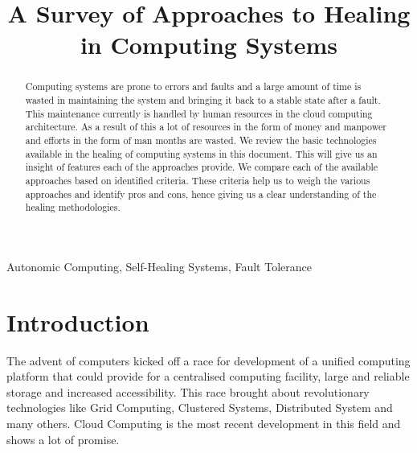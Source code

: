 \documentclass[conference]{IEEEtran}
\begin{document}
\title{A Survey of Approaches to Healing in Computing Systems}
\author
{
}
\maketitle

\begin{abstract}
Computing systems are prone to errors and faults and a large amount of time is wasted in maintaining the system and bringing it back to a stable state after a fault. This maintenance currently is handled by human resources in the cloud computing architecture. As a result of this a lot of resources in the form of money and manpower and efforts in the form of man months are wasted. We review the basic technologies available in the healing of computing systems in this document. This will give us an insight of features each of the approaches provide. We compare each of the available approaches based on identified criteria. These criteria help us to weigh the various approaches and identify pros and cons, hence giving us a clear understanding of the healing methodologies.
\end{abstract}
\begin{IEEEkeywords}
Autonomic Computing, Self-Healing Systems, Fault Tolerance
\end{IEEEkeywords}

\section{Introduction}
The advent of computers kicked off a race for development of a unified computing platform that could provide for a centralised computing facility, large and reliable storage and increased accessibility.\cite{FAILURE_5} This race brought about revolutionary technologies like Grid Computing, Clustered Systems, Distributed System and many others. Cloud Computing is the most recent development in this field and shows a lot of promise.
\end{document}
